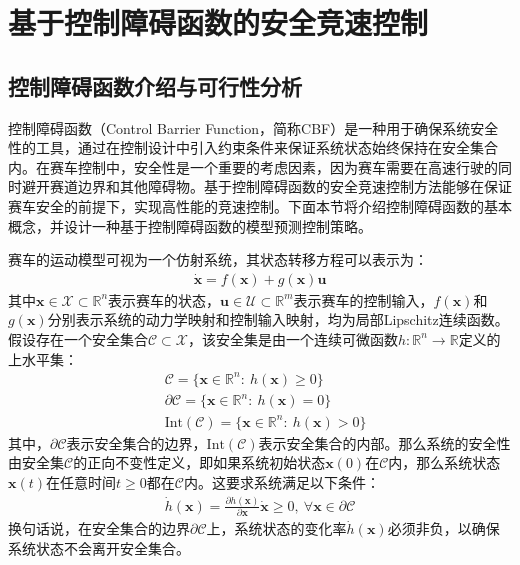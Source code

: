 \section{基于控制障碍函数的安全竞速控制}
\subsection{控制障碍函数介绍与可行性分析}
控制障碍函数（Control Barrier Function，简称CBF）是一种用于确保系统安全性的工具，通过在控制设计中引入约束条件来保证系统状态始终保持在安全集合内\cite{ames2016control, ames2019control}。在赛车控制中，安全性是一个重要的考虑因素，因为赛车需要在高速行驶的同时避开赛道边界和其他障碍物。基于控制障碍函数的安全竞速控制方法能够在保证赛车安全的前提下，实现高性能的竞速控制。下面本节将介绍控制障碍函数的基本概念，并设计一种基于控制障碍函数的模型预测控制策略。

赛车的运动模型可视为一个仿射系统，其状态转移方程可以表示为：
\begin{equation}
\begin{aligned}
    \dot{\boldsymbol{x}}=f(\boldsymbol{x})+g(\boldsymbol{x})\boldsymbol{u}
\end{aligned}
\label{equ:system}
\end{equation}
其中$\boldsymbol{x}\in \mathcal{X}\subset \mathbb{R}^n$表示赛车的状态，$\boldsymbol{u}\in \mathcal{U}\subset \mathbb{R}^m$表示赛车的控制输入，$f(\boldsymbol{x})$和$g(\boldsymbol{x})$分别表示系统的动力学映射和控制输入映射，均为局部Lipschitz连续函数。假设存在一个安全集合$\mathcal{C}\subset \mathcal{X}$，该安全集是由一个连续可微函数$h:\mathbb{R}^n\rightarrow \mathbb{R}$定义的上水平集：
\begin{subequations}
\begin{align}
& \mathcal{C} = \{\boldsymbol{x}\in \mathbb{R}^n: \ h(\boldsymbol{x})\geq 0\} \label{eq:cbf1} \\
& \partial \mathcal{C}= \{\boldsymbol{x}\in \mathbb{R}^n: \ h(\boldsymbol{x})= 0\} \label{eq:cbf2} \\
& \text{Int}(\mathcal{C})= \{\boldsymbol{x}\in \mathbb{R}^n: \ h(\boldsymbol{x})> 0\} \label{eq:cbf3}
\end{align}
\end{subequations}
其中，$\partial \mathcal{C}$表示安全集合的边界，$\text{Int}(\mathcal{C})$表示安全集合的内部。那么系统的安全性由安全集$\mathcal{C}$的正向不变性定义，即如果系统初始状态$\boldsymbol{x}(0)$在$\mathcal{C}$内，那么系统状态$\boldsymbol{x}(t)$在任意时间$t\geq 0$都在$\mathcal{C}$内。这要求系统满足以下条件：
\begin{equation}
\begin{aligned}
    \dot{h}(\boldsymbol{x})=\frac{\partial h(\boldsymbol{x})}{\partial \boldsymbol{x}}\dot{\boldsymbol{x}} \geq 0, \ \forall \boldsymbol{x}\in \partial \mathcal{C}
\end{aligned}
\end{equation}
换句话说，在安全集合的边界$\partial \mathcal{C}$上，系统状态的变化率$\dot{h}(\boldsymbol{x})$必须非负，以确保系统状态不会离开安全集合。

